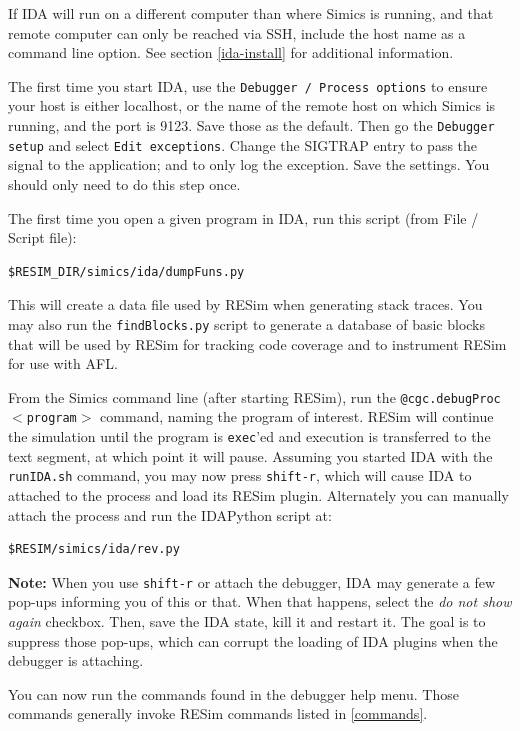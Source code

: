 \documentclass[titlepage]{article}
\begin{document}
If IDA will run on a different computer than where Simics is running, and that remote computer can only be reached via SSH, include the host 
name as a command line option.  See section \ref{ida-install} for additional information.

The first time you start IDA, use the {\tt Debugger / Process options} to ensure your host is either localhost, or the name of the remote host
on which Simics is running, and the port is 9123.  Save those as 
the default.  Then go the {\tt Debugger setup} and select {\tt Edit exceptions}.  Change the SIGTRAP entry to pass the signal to the application;
and to only log the exception.  Save the settings.  You should only need to do this step once.

The first time you open a given program in IDA, run this script (from File / Script file):
\begin{verbatim}
$RESIM_DIR/simics/ida/dumpFuns.py 
\end{verbatim}
\noindent This will create a data file used by RESim when generating stack traces.
You may also run the {\tt findBlocks.py} script to generate a database of basic blocks that will be used by RESim for tracking code
coverage and to instrument RESim for use with AFL.

From the Simics command line (after starting RESim), run the {\tt @cgc.debugProc$<$program$>$} command, naming the program of interest.
RESim will continue the simulation until the program is {\tt exec}'ed and execution is transferred to the text segment, at which point it will pause.
Assuming you started IDA with the {\tt runIDA.sh} command, you may now press {\tt shift-r}, which will cause IDA to attached to the
process and load its RESim plugin.  Alternately you can manually attach the process and run the IDAPython script at:
\begin{verbatim}
$RESIM/simics/ida/rev.py
\end{verbatim}

\noindent \textbf{Note:} When you use {\tt shift-r} or attach the debugger, IDA may generate a few pop-ups informing you of this or that.  When that happens, select the 
\textit{do not show again} checkbox.  Then, save the IDA state, kill it and restart it.  The goal is to suppress those pop-ups, which can corrupt the
loading of IDA plugins when the debugger is attaching.

You can now run the commands found in the debugger help menu.  Those commands generally invoke RESim commands listed in \ref{commands}.
\end{document}

